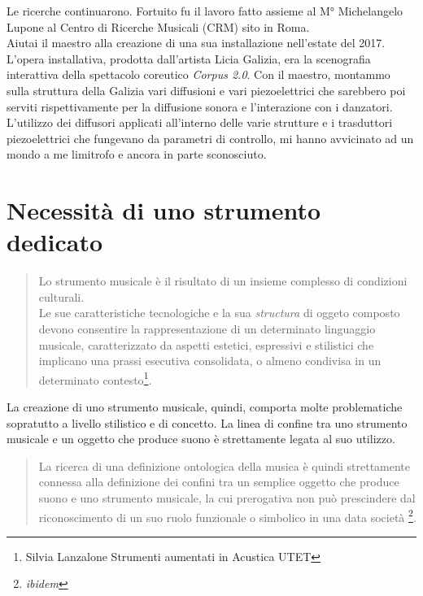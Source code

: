 Le ricerche continuarono. Fortuito fu il lavoro fatto assieme al M° Michelangelo Lupone al Centro di Ricerche Musicali (CRM) sito in Roma. \\
Aiutai il maestro alla creazione di una sua installazione nell'estate del 2017. L'opera installativa, prodotta dall'artista Licia Galizia, era la scenografia interattiva della spettacolo coreutico \textit{Corpus 2.0}. Con il maestro, montammo sulla struttura della Galizia vari diffusioni e vari piezoelettrici che sarebbero poi serviti rispettivamente per la diffusione sonora e l'interazione con i danzatori. L'utilizzo dei diffusori applicati all'interno delle varie strutture e i trasduttori piezoelettrici che fungevano da parametri di controllo, mi hanno avvicinato ad un mondo a me limitrofo e ancora in parte sconosciuto. \\

\section{Necessità di uno strumento dedicato}
\begin{small}
\begin{quotation}
Lo strumento musicale è il risultato di un insieme complesso di condizioni culturali. \\
Le sue caratteristiche tecnologiche e la sua \textit{structura} di oggeto composto devono consentire la rappresentazione di un determinato linguaggio musicale, caratterizzato da aspetti estetici, espressivi e stilistici che implicano una prassi esecutiva consolidata, o almeno condivisa in un determinato contesto\footnote{Silvia Lanzalone Strumenti aumentati in Acustica UTET}.
\end{quotation}
\end{small}
La creazione di uno strumento musicale, quindi, comporta molte problematiche sopratutto a livello stilistico e di concetto. La linea di confine tra uno strumento musicale e un oggetto che produce suono è strettamente legata al suo utilizzo. 
\begin{small}
\begin{quotation}
La ricerca di una definizione ontologica della musica è quindi strettamente connessa alla definizione dei confini tra un semplice oggetto che produce suono e uno strumento musicale, la cui prerogativa non può prescindere dal riconoscimento di un suo ruolo funzionale o simbolico in una data società
\footnote{\textit{ibidem}}.
\end{quotation}
\end{small}

